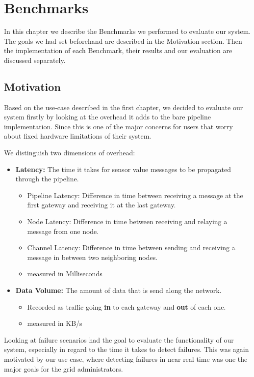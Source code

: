 \chapter{Benchmarks}

In this chapter we describe the Benchmarks we performed to evaluate our system. 
The goals we had set beforehand are described in the Motivation section. 
Then the implementation of each Benchmark, their results and our evaluation are discussed separately.

\section{Motivation}

Based on the use-case described in the first chapter, we decided to evaluate our system firstly by looking at the overhead it adds to the bare pipeline implementation. 
Since this is one of the major concerns for users that worry about fixed hardware limitations of their system.

We distinguish two dimensions of overhead:

\begin{itemize}
  \item \textbf{Latency:} The time it takes for sensor value messages to be propagated through the pipeline.
	\begin{itemize}
	  \item Pipeline Latency: Difference in time between receiving a message at the first gateway and receiving it at the last gateway.
	  \item Node Latency: Difference in time between receiving and relaying a message from one node.
	  \item Channel Latency: Difference in time between sending and receiving a message in between two neighboring nodes.
	  \item measured in Milliseconds
	\end{itemize}
  \item \textbf{Data Volume:} The amount of data that is send along the network.
	\begin{itemize}
	  \item Recorded as traffic going \textbf{in} to each gateway and \textbf{out} of each one.
	  \item measured in KB/s
	\end{itemize}
\end{itemize}

Looking at failure scenarios had the goal to evaluate the functionality of our system, especially in regard to the time it takes to detect failures.
This was again motivated by our use case, where detecting failures in near real time was one the major goals for the grid administrators. 

